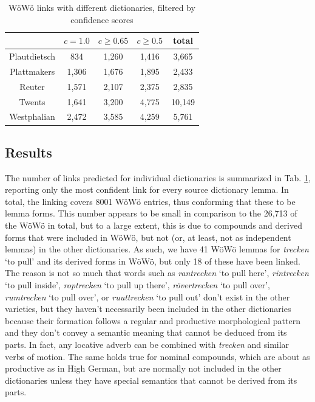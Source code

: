 \documentclass{article}
\newcommand{\word}[1]{\textsl{#1}}
\begin{document}
\begin{table}
\begin{tabular}{ccccc}
                & $c=1.0$   & $c\geq 0.65$  & $c \geq 0.5$  & total \\ \hline
Plautdietsch    & 834       & 1,260          & 1,416          & 3,665 \\
Plattmakers     & 1,306     & 1,676          & 1,895          & 2,433 \\
Reuter          & 1,571     & 2,107          & 2,375          & 2,835 \\
Twents          & 1,641     & 3,200          & 4,775          & 10,149\\
Westphalian     & 2,472     & 3,585          & 4,259          & 5,761 \\\hline
\end{tabular}
\caption{WöWö links with different dictionaries, filtered by confidence scores}
\label{tab-results}
\end{table}

\subsection{Results}

The number of links predicted for individual dictionaries is summarized in Tab. \ref{tab-results}, reporting only the most confident link for every source dictionary lemma.
In total, the linking covers 8001 WöWö entries, thus conforming that these to be lemma forms. This number appears to be small in comparison to the 26,713 of the WöWö in total, but to a large extent, this is due to compounds and derived forms that were included in WöWö, but not (or, at least, not as independent lemmas) in the other dictionaries. As such, we have 41 WöWö lemmas for \word{trecken} `to pull' and its derived forms in WöWö, but only 18 of these have been linked. The reason is not so much that words such as \word{rantrecken} `to pull here', \word{rintrecken} `to pull inside', \word{roptrecken} `to pull up there', \word{rövertrecken} `to pull over', \word{rumtrecken} `to pull over', or \word{ruuttrecken} `to pull out' don't exist in the other varieties, but they haven't necessarily been included in the other dictionaries because their formation follows a regular and productive morphological pattern and they don't convey a semantic meaning that cannot be deduced from its parts. In fact, any locative adverb can be combined with \word{trecken} and similar verbs of motion. The same holds true for nominal compounds, which are about as productive as in High German, but are normally not included in the other dictionaries unless they have special semantics that cannot be derived from its parts.
\end{document}
